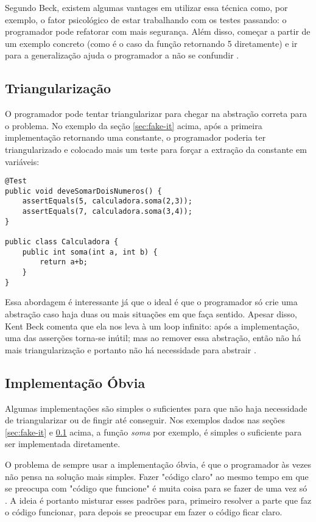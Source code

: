 Segundo Beck, existem algumas vantages em utilizar essa técnica como, por exemplo, o fator psicológico de estar
trabalhando com os testes passando: o programador pode refatorar com mais segurança. Além disso, começar a partir
de um exemplo concreto (como é o caso da função retornando 5 diretamente) e ir para a generalização ajuda o programador
a não se confundir \cite{TDDByExample}.

\subsection{Triangularização}
\label{sec:triangularizacao}

O programador pode tentar triangularizar para chegar na abstração correta para o problema. No exemplo da seção \ref{sec:fake-it} acima, 
após a primeira implementação retornando uma constante, o programador poderia ter triangularizado e colocado mais um teste para
forçar a extração da constante em variáveis:

\begin{lstlisting}[frame=trbl]
@Test
public void deveSomarDoisNumeros() {
	assertEquals(5, calculadora.soma(2,3));
	assertEquals(7, calculadora.soma(3,4));
}

public class Calculadora {
	public int soma(int a, int b) {
		return a+b;
	}
}
\end{lstlisting}

Essa abordagem é interessante já que o ideal é que o programador só crie uma abstração caso haja duas ou mais situações em que
faça sentido. Apesar disso, Kent Beck comenta que ela nos leva à um loop infinito: após a implementação, uma das asserções torna-se
inútil; mas ao remover essa abstração, então não há mais triangularização e portanto não há necessidade para abstrair \cite{TDDByExample}.

\subsection{Implementação Óbvia}

Algumas implementações são simples o suficientes para que não haja necessidade de triangularizar ou de fingir até conseguir. Nos exemplos
dados nas seções \ref{sec:fake-it} e \ref{sec:triangularizacao} acima, a função \textit{soma} por exemplo, é simples o suficiente para
ser implementada diretamente.

O problema de sempre usar a implementação óbvia, é que o programador às vezes não pensa na solução mais simples. Fazer "código claro" ao
mesmo tempo em que se preocupa com "código que funcione" é muita coisa para se fazer de uma vez só \cite{TDDByExample}. A ideia é portanto
misturar esses padrões para, primeiro resolver a parte que faz o código funcionar, para depois se preocupar em fazer o código ficar claro.

